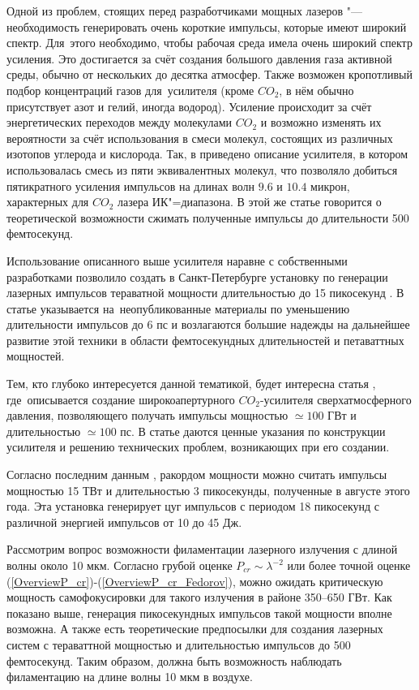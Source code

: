 Одной из проблем, стоящих перед разработчиками мощных лазеров "--- необходимость генерировать очень короткие импульсы,
которые имеют широкий спектр. Для~этого необходимо, чтобы рабочая среда имела очень широкий спектр усиления.
Это достигается за счёт создания большого давления газа активной среды, обычно от нескольких до десятка атмосфер.
Также возможен кропотливый подбор концентраций газов для~усилителя (кроме $CO_2$, в нём обычно присутствует азот и гелий, иногда водород).
Усиление происходит за счёт энергетических переходов между молекулами $CO_2$ и возможно изменять их вероятности за счёт использования в смеси
молекул, состоящих из различных изотопов углерода и кислорода. Так, в \cite{PicosecondAmplifier2007} приведено описание усилителя,
в котором использовалась смесь из пяти эквивалентных молекул, что позволяло добиться пятикратного усиления импульсов
на длинах волн $9.6$ и $10.4$ микрон, характерных для $CO_2$ лазера ИК"=диапазона. В этой же статье говорится о теоретической возможности сжимать полученные
импульсы до длительности 500 фемтосекунд.


Использование описанного выше усилителя наравне с собственными разработками позволило создать в Санкт-Петербурге
установку по генерации лазерных импульсов тераватной мощности длительностью до 15 пикосекунд \cite{TerawattCO2laser2006}.
В статье указывается на~неопубликованные материалы по уменьшению длительности импульсов до 6 пс
и возлагаются большие надежды на дальнейшее развитие этой техники в области фемтосекундных длительностей и петаваттных мощностей.


Тем, кто глубоко интересуется данной тематикой, будет интересна статья \cite{BaranovKuchinskiyTomashevich2008},
где~описывается создание широкоапертурного $CO_2$-усилителя сверхатмосферного давления, позволяющего получать
импульсы мощностью $\simeq 100$ ГВт и длительностью $\simeq 100$ пс. В статье даются ценные указания по конструкции усилителя
и решению технических проблем, возникающих при его создании.


Согласно последним данным \cite{HaberbergerTochitskyJoshi2010}, ракордом мощности можно считать импульсы мощностью
15 ТВт и длительностью 3 пикосекунды, полученные в августе этого года. Эта установка генерирует цуг импульсов
с периодом 18 пикосекунд с различной энергией импульсов от 10 до 45 Дж.


Рассмотрим вопрос возможности филаментации лазерного излучения с длиной волны около 10 мкм. Согласно грубой оценке
$P_{cr} \sim \lambda^{-2}$ или более точной оценке (\ref{OverviewP_cr})-(\ref{OverviewP_cr_Fedorov}), можно ожидать
критическую мощность самофокусировки для такого излучения в районе 350--650 ГВт. Как показано выше, генерация пикосекундных
импульсов такой мощности вполне возможна. А также есть теоретические предпосылки для создания лазерных систем
с тераваттной мощностью и длительностью импульсов до 500 фемтосекунд. Таким образом, должна быть возможность наблюдать
филаментацию на длине волны 10 мкм в воздухе.


